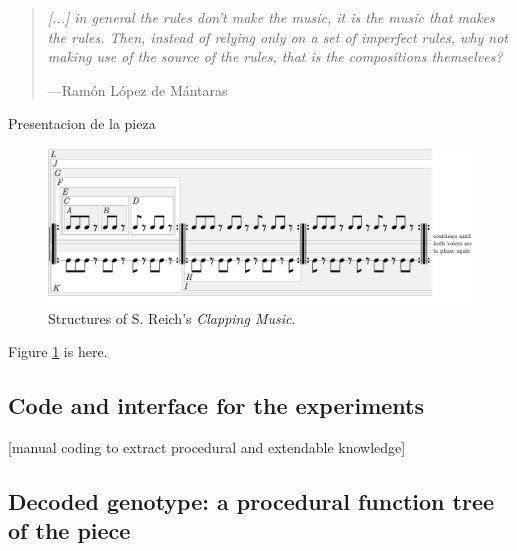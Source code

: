 \documentclass{article}
\begin{document}
\begin{samepage}
\begin{quotation}
\textsl{[...] in general the rules don't make the music, it is the music that makes the rules. Then, instead of relying only on a set of imperfect rules, why not making use of the source of the rules, that is the compositions themselves?
}

---Ram\'{o}n L\'{o}pez de M\'{a}ntaras \cite{LopezdeMantaras:2006:MMA:1565082.1565089}
\end{quotation}
\end{samepage}



{\color{red}

Presentacion de la pieza

}


\begin{figure}
  \includegraphics[width=\linewidth]{figs/clapping_patterns.pdf}
  \caption{Structures of S. Reich's \emph{Clapping Music}.}
  \label{fig:boat1}
\end{figure}

{\color{red}

Figure \ref{fig:boat1} is here.

}

\subsection{Code and interface for the experiments}

{\color{red}

[manual coding to extract procedural and extendable knowledge]\cite{Hofmann2015} 

}

\subsection{Decoded genotype: a procedural function tree of the piece}
\end{document}
